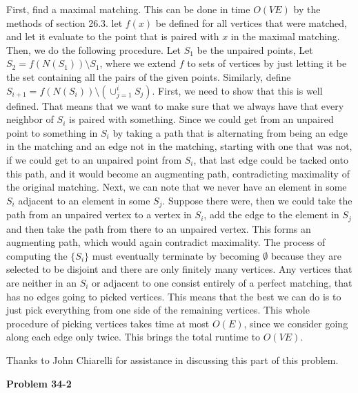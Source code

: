 \documentclass{article}
\begin{document}
\begin{enumerate}[a)]
First, find a maximal matching. This can be done in time $O(VE)$ by the methods of section 26.3. let $f(x)$ be defined for all vertices that were matched, and let it evaluate to the point that is paired with $x$ in the maximal matching. Then, we do the following procedure. Let $S_1$ be the unpaired points, Let $S_2 = f(N(S_1))\setminus S_1$, where we extend $f$ to sets of vertices by just letting it be the set containing all the pairs of the given points. Similarly, define $S_{i+1} = f(N(S_i))\setminus\left(\cup_{j=1}^{i} S_j\right)$. First, we need to show that this is well defined. That means that we want to make sure that we always have that every neighbor of $S_i$ is paired with something. Since we could get from an unpaired point to something in $S_i$ by taking a path that is alternating from being an edge in the matching and an edge not in the matching, starting with one that was not, if we could get to an unpaired point from $S_i$, that last edge could be tacked onto this path, and it would become an augmenting path, contradicting maximality of the original matching. Next, we can note that we never have an element in some $S_i$ adjacent to an element in some $S_j$. Suppose there were, then we could take the path from an unpaired vertex to a vertex in $S_i$, add the edge to the element in $S_j$ and then take the path from there to an unpaired vertex. This forms an augmenting path, which would again contradict maximality. The process of computing the $\{S_i\}$ must eventually terminate by becoming $\emptyset$ because they are selected to be disjoint and there are only finitely many vertices. Any vertices that are neither in an $S_i$ or adjacent to one consist entirely of a perfect matching, that has no edges going to picked vertices. This means that the best we can do is to just pick everything from one side of the remaining vertices. This whole procedure of picking vertices takes time at most $O(E)$, since we consider going along each edge only twice. This brings the total runtime to $O(VE)$. 

Thanks to John Chiarelli for assistance in discussing this part of this problem.

\end{enumerate}

\noindent\textbf{Problem 34-2}\\
\end{document}
